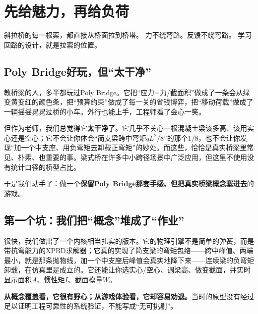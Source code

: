 
\chapter{先给魅力，再给负荷}

\vspace{0.5cm}

\begin{center}
{\small\color{muted} 斜拉桥的每一根索，都直接从桥面拉到桥塔。}
{\small\color{muted} 力不绕弯路。反馈不绕弯路。}
{\small\color{muted} 学习回路的设计，就是拉索的位置。}
\end{center}

\vspace{1cm}

\section{Poly Bridge好玩，但``太干净''}

教桥梁的人，多半都玩过Poly Bridge。它把``应力=力/截面积''做成了一条会从绿变黄变红的颜色条，把``预算约束''做成了每一关的省钱博弈，把``移动荷载''做成了一辆摇摇晃晃过桥的小车。外行也能上手，工程师看了会心一笑。

但作为老师，我们总觉得它\textbf{太干净了}。它几乎不关心一根混凝土梁该多高、该用实心还是空心；它不会让你体会``简支梁跨中弯矩$qL^2/8$''的那个$1/8$，也不会让你发现``加一个中支座、用负弯矩去卸载正弯矩''的妙处。而这些，恰恰是真实桥梁里常见、朴素、也重要的事。梁式桥在许多中小跨径场景中广泛应用，但这里不使用没有统计口径的桥型占比。

于是我们动手了：做一个\textbf{保留Poly Bridge那套手感、但把真实桥梁概念塞进去}的游戏。

\section{第一个坑：我们把``概念''堆成了``作业''}

很快，我们做出了一个内核相当扎实的版本。它的物理引擎不是简单的弹簧，而是带抗弯能力的XPBD求解器；它真的实现了简支梁的弯矩包络——跨中峰值、两端最小，就是那条抛物线，加一个中支座后峰值会真实地降下来——连续梁的负弯矩卸载，在仿真里是成立的。它还能让你选实心/空心、调梁高、做变截面，并实时显示面积$A$、惯性矩$I$、截面模量$W$。

\textbf{从概念覆盖看，它很有野心；从游戏体验看，它却容易劝退。}当时的原型没有经过足以证明工程可靠性的系统验证，不能写成“无可挑剔”。

